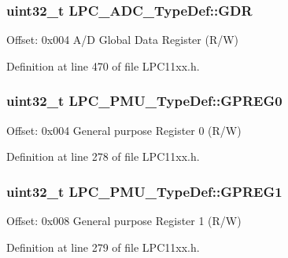 \subsubsection[{\texorpdfstring{G\+DR}{GDR}}]{ uint32\+\_\+t L\+P\+C\+\_\+\+A\+D\+C\+\_\+\+Type\+Def\+::\+G\+DR}\hypertarget{group___l_p_c11xx___definitions_ga6891936fcf717753e53ffed97d6329dd}{}\label{group___l_p_c11xx___definitions_ga6891936fcf717753e53ffed97d6329dd}
Offset\+: 0x004 A/D Global Data Register (R/W) 

Definition at line 470 of file L\+P\+C11xx.\+h.

\subsubsection[{\texorpdfstring{G\+P\+R\+E\+G0}{GPREG0}}]{ uint32\+\_\+t L\+P\+C\+\_\+\+P\+M\+U\+\_\+\+Type\+Def\+::\+G\+P\+R\+E\+G0}\hypertarget{group___l_p_c11xx___definitions_ga8aa25492f1cc07e7dd2a3458cb1bb466}{}\label{group___l_p_c11xx___definitions_ga8aa25492f1cc07e7dd2a3458cb1bb466}
Offset\+: 0x004 General purpose Register 0 (R/W) 

Definition at line 278 of file L\+P\+C11xx.\+h.

\subsubsection[{\texorpdfstring{G\+P\+R\+E\+G1}{GPREG1}}]{ uint32\+\_\+t L\+P\+C\+\_\+\+P\+M\+U\+\_\+\+Type\+Def\+::\+G\+P\+R\+E\+G1}\hypertarget{group___l_p_c11xx___definitions_gae1077907bc2cb229a78dd4349de107f7}{}\label{group___l_p_c11xx___definitions_gae1077907bc2cb229a78dd4349de107f7}
Offset\+: 0x008 General purpose Register 1 (R/W) 

Definition at line 279 of file L\+P\+C11xx.\+h.

